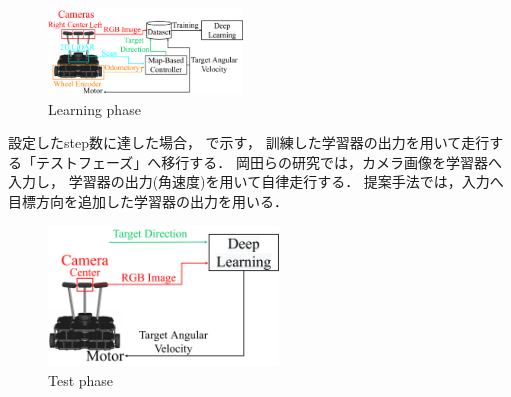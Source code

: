 \documentclass[10pt]{jarticle}
\begin{document}
    \begin{center}
        \begin{figure}[h]
            \centering
            \includegraphics[width=0.46\textwidth]{./fig/system_learning.pdf}
            \caption{Learning phase}
            \label{fig:system_learning}
        \end{figure}
    \end{center}

    設定したstep数に達した場合，
    で示す，
    訓練した学習器の出力を用いて走行する「テストフェーズ」へ移行する．
    岡田らの研究では，カメラ画像を学習器へ入力し，
    学習器の出力(角速度)を用いて自律走行する．
    提案手法では，入力へ目標方向を追加した学習器の出力を用いる．
    \begin{center}
        \begin{figure}[h]
            \centering
            \includegraphics[width=6.1cm]{./fig/system_test.pdf}
            \caption{Test phase}
            \label{fig:system_test}
        \end{figure}
    \end{center}
    \vspace{-1zh}
\end{document}
